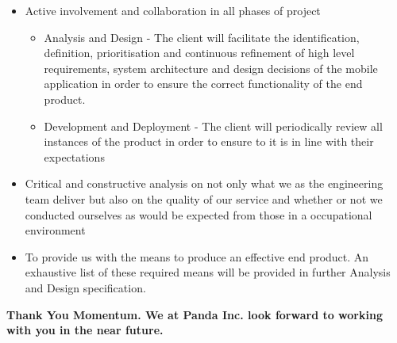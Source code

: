 \documentclass[11pt]{article}
\begin{document}
\begin{itemize}
\item Active involvement and collaboration in all phases of project
  \begin{itemize}
  \item Analysis and Design - The client will facilitate the identification, definition, prioritisation and continuous refinement of high level requirements, system architecture and design decisions of the mobile application in order to ensure the correct functionality of the end product.
  \item Development and Deployment - The client will periodically review all instances of the product in order to ensure to it is in line with their expectations 
  \end{itemize}
\item Critical and constructive analysis on not only what we as the engineering team deliver but also on the quality of our service and whether or not we conducted ourselves as would be expected from those in a occupational environment
\item To provide us with the means to produce an effective end product. An exhaustive list of these required means will be provided in further Analysis and Design specification.
  
\end{itemize}
\begin{center}
{\sffamily\bfseries
\large Thank You Momentum. We at Panda Inc. look forward to working with you in the near future.
}
\end{center}
\end{document}
